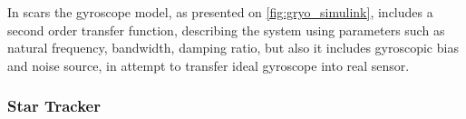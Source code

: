         

        In \ac{scars} the gyroscope model, as presented on \autoref{fig:gryo_simulink}, includes a second order transfer function, describing the system using parameters such as natural frequency, bandwidth, damping ratio, but also it includes gyroscopic bias and noise source, in attempt to transfer ideal gyroscope into real sensor. 




    \subsubsection{Star Tracker}

